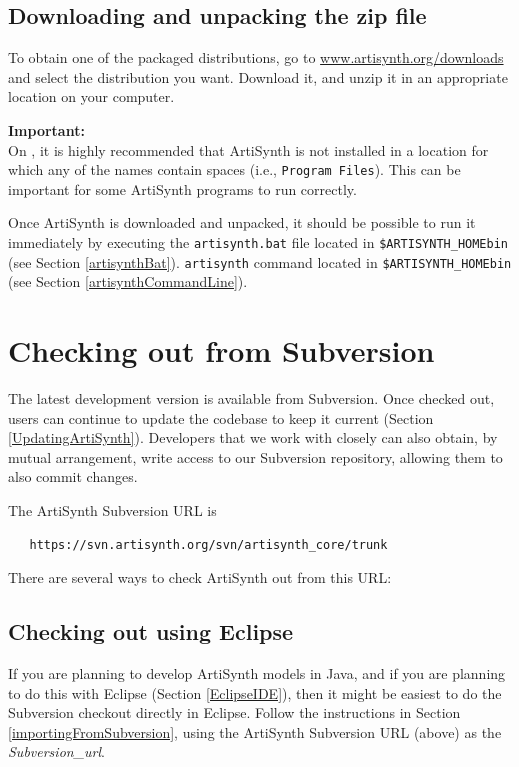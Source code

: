 \subsection{Downloading and unpacking the zip file}

To obtain one of the packaged distributions, go to
\href{http://www.artisynth.org/downloads} 
{www.artisynth.org/downloads}
and select the distribution
you want. Download it, and unzip it in an appropriate location on your
computer.

\ifWindows
\begin{sideblock}
{\bf Important:}\\
On \SYSTEM, it is highly recommended that ArtiSynth is not installed
in a location for which any of the \directory names contain spaces (i.e.,
{\tt Program Files}).  This can be important for some ArtiSynth
programs to run correctly.
\end{sideblock}
\else\fi

Once ArtiSynth is downloaded and unpacked, it should be possible to
run it immediately by executing the
\ifWindows
{\tt artisynth.bat} file located in {\tt \$ARTISYNTH\_HOME\SEP bin}
(see Section \ref{artisynthBat}).
\else
{\tt artisynth} command located in {\tt \$ARTISYNTH\_HOME\SEP bin}
(see Section \ref{artisynthCommandLine}).
\fi

\section{Checking out from Subversion}
\label{SubversionCheckout}

The latest development version is available from Subversion. Once
checked out, users can continue to update the codebase to keep it
current (Section \ref{UpdatingArtiSynth}). Developers that we work
with closely can also obtain, by mutual arrangement, write access to
our Subversion repository, allowing them to also commit changes.

The ArtiSynth Subversion URL is
\begin{verbatim}
   https://svn.artisynth.org/svn/artisynth_core/trunk
\end{verbatim}
There are several ways to check ArtiSynth out from this URL:

\subsection{Checking out using Eclipse}
\label{ArtiSynthEclipseCheckout}

If you are planning to develop ArtiSynth models in Java, and if you
are planning to do this with Eclipse (Section \ref{EclipseIDE}), then
it might be easiest to do the Subversion checkout directly in Eclipse.
Follow the instructions in Section \ref{importingFromSubversion},
using the ArtiSynth Subversion URL (above) as the {\it
Subversion\_url}.

